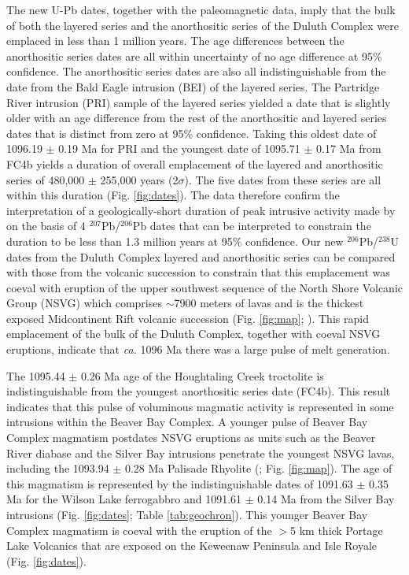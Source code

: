 \documentclass[11pt,letterpaper]{article}
\begin{document}
The new U-Pb dates, together with the paleomagnetic data, imply that the bulk of both the layered series and the anorthositic series of the Duluth Complex were emplaced in less than 1 million years. The age differences between the anorthositic series dates are all within uncertainty of no age difference at 95$\%$ confidence. The anorthositic series dates are also all indistinguishable from the date from the Bald Eagle intrusion (BEI) of the layered series. The Partridge River intrusion (PRI) sample of the layered series yielded a date that is slightly older with an age difference from the rest of the anorthositic and layered series dates that is distinct from zero at 95$\%$ confidence. Taking this oldest date of 1096.19 $\pm$ 0.19 Ma for PRI and the youngest date of 1095.71 $\pm$ 0.17 Ma from FC4b yields a duration of overall emplacement of the layered and anorthositic series of 480,000 $\pm$ 255,000 years (2$\sigma$). The five dates from these series are all within this duration (Fig. \ref{fig:dates}). The data therefore confirm the interpretation of a geologically-short duration of peak intrusive activity made by \cite{Paces1993a} on the basis of 4 $^{207}$Pb/$^{206}$Pb dates that can be interpreted to constrain the duration to be less than 1.3 million years at 95$\%$ confidence. Our new $^{206}$Pb/$^{238}$U dates from the Duluth Complex layered and anorthositic series can be compared with those from the volcanic succession to constrain that this emplacement was coeval with eruption of the upper southwest sequence of the North Shore Volcanic Group (NSVG) which comprises $\sim$7900 meters of lavas and is the thickest exposed Midcontinent Rift volcanic succession (Fig. \ref{fig:map}; \citealp{Green2011a,Swanson-Hysell2019a}). This rapid emplacement of the bulk of the Duluth Complex, together with coeval NSVG eruptions, indicate that \textit{ca.} 1096 Ma there was a large pulse of melt generation.

The 1095.44 $\pm$ 0.26 Ma age of the Houghtaling Creek troctolite is indistinguishable from the youngest anorthositic series date (FC4b). This result indicates that this pulse of voluminous magmatic activity is represented in some intrusions within the Beaver Bay Complex. A younger pulse of Beaver Bay Complex magmatism postdates NSVG eruptions as units such as the Beaver River diabase and the Silver Bay intrusions penetrate the youngest NSVG lavas, including the 1093.94 $\pm$ 0.28 Ma Palisade Rhyolite (\citealp{Miller2001a, Swanson-Hysell2019a}; Fig. \ref{fig:map}). The age of this magmatism is represented by the indistinguishable dates of 1091.63 $\pm$ 0.35 Ma for the Wilson Lake ferrogabbro and 1091.61 $\pm$ 0.14 Ma from the Silver Bay intrusions (Fig. \ref{fig:dates}; Table \ref{tab:geochron}). This younger Beaver Bay Complex magmatism is coeval with the eruption of the $>$5 km thick Portage Lake Volcanics that are exposed on the Keweenaw Peninsula and Isle Royale (Fig. \ref{fig:dates}).
\end{document}
